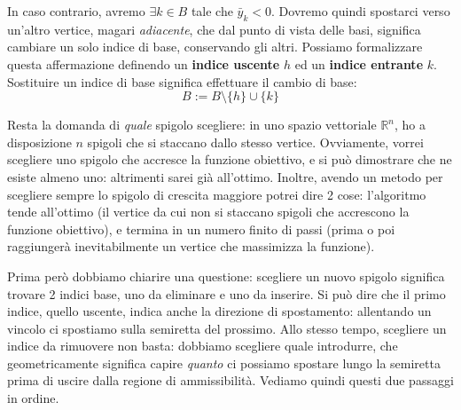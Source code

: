 \documentclass[a4paper,11pt]{article}
\begin{document}
In caso contrario, avremo $\exists k \in B$ tale che $\bar{y}_k < 0$.
Dovremo quindi spostarci verso un'altro vertice, magari \textit{adiacente}, che dal punto di vista delle basi, significa cambiare un solo indice di base, conservando gli altri.
Possiamo formalizzare questa affermazione definendo un \textbf{indice uscente} $h$ ed un \textbf{indice entrante} $k$.
Sostituire un indice di base significa effettuare il cambio di base:
$$
B := B \setminus \{h\} \cup \{k\}
$$

Resta la domanda di \textit{quale} spigolo scegliere: in uno spazio vettoriale $\mathbb{R}^n$, ho a disposizione $n$ spigoli che si staccano dallo stesso vertice.
Ovviamente, vorrei scegliere uno spigolo che accresce la funzione obiettivo, e si può dimostrare che ne esiste almeno uno: altrimenti sarei già all'ottimo.
Inoltre, avendo un metodo per scegliere sempre lo spigolo di crescita maggiore potrei dire 2 cose: l'algoritmo tende all'ottimo (il vertice da cui non si staccano spigoli che accrescono la funzione obiettivo), e termina in un numero finito di passi (prima o poi raggiungerà inevitabilmente un vertice che massimizza la funzione).

Prima però dobbiamo chiarire una questione: scegliere un nuovo spigolo significa trovare 2 indici base, uno da eliminare e uno da inserire.
Si può dire che il primo indice, quello uscente, indica anche la direzione di spostamento: allentando un vincolo ci spostiamo sulla semiretta del prossimo.
Allo stesso tempo, scegliere un indice da rimuovere non basta: dobbiamo scegliere quale introdurre, che geometricamente significa capire \textit{quanto} ci possiamo spostare lungo la semiretta prima di uscire dalla regione di ammissibilità.
Vediamo quindi questi due passaggi in ordine.
\end{document}
